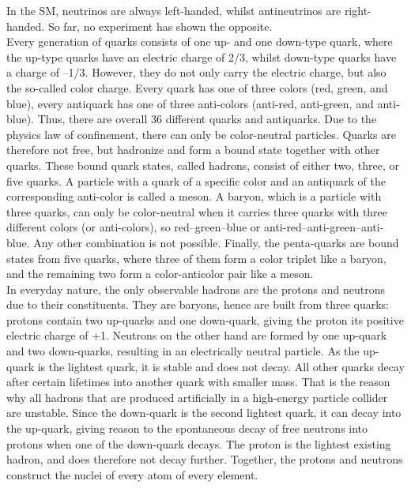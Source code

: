 In the SM, neutrinos are always left-handed, whilst antineutrinos are right-handed.
So far, no experiment has shown the opposite.\\
Every generation of quarks consists of one up- and one down-type quark, where the up-type quarks have an electric charge of 2/3, whilst down-type quarks have a charge of --1/3.
However, they do not only carry the electric charge, but also the so-called color charge.
Every quark has one of three colors (red, green, and blue), every antiquark has one of three anti-colors (anti-red, anti-green, and anti-blue).
Thus, there are overall 36 different quarks and antiquarks.
Due to the physics law of confinement, there can only be color-neutral particles.
Quarks are therefore not free, but hadronize and form a bound state together with other quarks.
These bound quark states, called hadrons, consist of either two, three, or five quarks.
A particle with a quark of a specific color and an antiquark of the corresponding anti-color is called a meson.
A baryon, which is a particle with three quarks, can only be color-neutral when it carries three quarks with three different colors (or anti-colors), so red--green--blue or anti-red--anti-green--anti-blue.
Any other combination is not possible.
Finally, the penta-quarks are bound states from five quarks, where three of them form a color triplet like a baryon, and the remaining two form a color-anticolor pair like a meson.\\
In everyday nature, the only observable hadrons are the protons and neutrons due to their constituents.
They are baryons, hence are built from three quarks:
protons contain two up-quarks and one down-quark, giving the proton its positive electric charge of +1.
Neutrons on the other hand are formed by one up-quark and two down-quarks, resulting in an electrically neutral particle. 
As the up-quark is the lightest quark, it is stable and does not decay.
All other quarks decay after certain lifetimes into another quark with smaller mass.
That is the reason why all hadrons that are produced artificially in a high-energy particle collider are unstable.
Since the down-quark is the second lightest quark, it can decay into the up-quark, giving reason to the spontaneous decay of free neutrons into protons when one of the down-quark decays.
The proton is the lightest existing hadron, and does therefore not decay further.
Together, the protons and neutrons construct the nuclei of every atom of every element.

